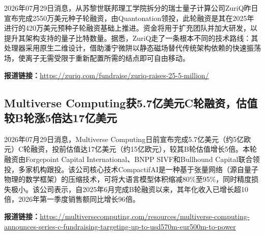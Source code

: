 \documentclass[12pt,a4paper]{ctexart}
\begin{document}
2026年07月29日消息，从苏黎世联邦理工学院拆分的瑞士量子计算公司ZuriQ昨日宣布完成2550万美元种子轮融资，由Quantonation领投，此轮融资是其在2025年进行的420万美元预种子轮融资基础上推进。资金将用于扩充团队并加大研发，以提升其架构支持的量子比特数量。据悉，ZuriQ走了一条根本不同的技术路线：其处理器采用原生二维设计，借助潘宁微阱以静态磁场替代传统架构依赖的快速振荡场，使离子无需受限于重新配置所需的结点即可自由移动。

\noindent\textbf{报道链接：}\url{https://zuriq.com/fundraise/zuriq-raises-25-5-million/}

\subsection{ Multiverse Computing获5.7亿美元C轮融资，估值较B轮涨5倍达17亿美元 }

2026年07月29日消息，Multiverse Computing日前宣布完成5.7亿美元（约5亿欧元）C轮融资，投前估值达17亿美元（约15亿欧元），较其B轮估值增长5倍。本轮融资由Forgepoint Capital International、BNPP SIVF和Bullhound Capital联合领投，多家机构跟投。该公司核心技术CompactifAI是一种基于张量网络（源自量子物理的数学框架）的压缩技术，可将大语言模型体积缩减80\%至95\%，同时精度损失极小。该公司表示，自2025年6月完成B轮融资以来，其年化收入已增长超10倍，2026年第一季度销售额同比增长96倍。

\noindent\textbf{报道链接：}\url{https://multiversecomputing.com/resources/multiverse-computing-announces-series-c-fundraising-targeting-up-to-usd570m-eur500m-to-power}
\end{document}
